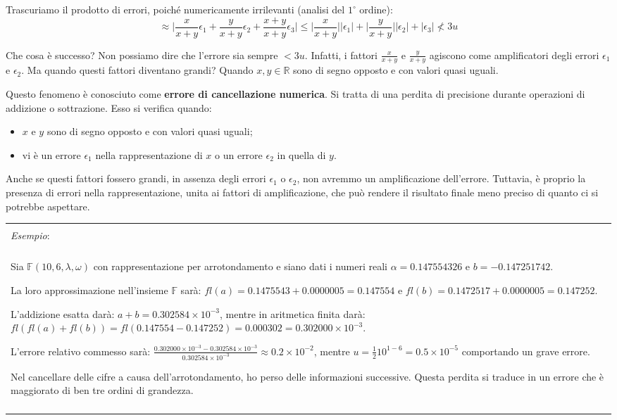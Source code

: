 \documentclass{article}
\newenvironment{example}
{\begin{center}
        \begin{tabular}{|p{0.9\textwidth}|}
            \hline \\ 
            \textit{Esempio}: \\\\ 
        }
        {
            \\\\ \hline
        \end{tabular}
    \end{center}
}
\begin{document}
\begin{itemize}
        Trascuriamo il prodotto di errori, poiché numericamente irrilevanti
        (analisi del $1^{\circ}$ ordine):
        $$\approx \Big\lvert
        \frac{x}{x+y}\epsilon_1+\frac{y}{x+y}\epsilon_2+\frac{x+y}{x+y}\epsilon_3\Big\rvert\leq
        \Big\lvert \frac{x}{x+y}\Big\rvert\lvert \epsilon_1\rvert+\Big\lvert
        \frac{y}{x+y}\Big\rvert \lvert \epsilon_2\rvert+\lvert
        \epsilon_3\rvert\nless 3u$$

        Che cosa è successo? Non possiamo dire che l'errore sia sempre $<3u$.
        Infatti, i fattori $\frac{x}{x+y}$ e $\frac{y}{x+y}$ agiscono come
        amplificatori degli errori $\epsilon_1$ e $\epsilon_2$. Ma quando questi fattori diventano grandi?
        Quando $x,y\in \mathbb{R}$ sono di segno opposto e con valori quasi
        uguali. 

        Questo fenomeno è conosciuto come \textbf{errore di
        cancellazione numerica}. Si tratta di una perdita di
        precisione durante operazioni di addizione o sottrazione. Esso si
        verifica quando:
        \begin{itemize}
            \item $x$ e $y$ sono di segno opposto e con valori quasi uguali;
            \item vi è un errore $\epsilon_1$ nella rappresentazione di $x$ o
                un errore $\epsilon_2$ in quella di $y$.
        \end{itemize}
        Anche se questi fattori fossero grandi, in assenza degli
        errori $\epsilon_1$ o $\epsilon_2$, non avremmo un amplificazione
        dell'errore. Tuttavia, è proprio la presenza di errori nella
        rappresentazione, unita ai fattori di amplificazione, che può
        rendere il risultato finale meno preciso di quanto ci si potrebbe
        aspettare.
\end{itemize}
\begin{example}
   Sia $\mathbb{F}(10,6,\lambda,\omega)$ con rappresentazione per arrotondamento e siano
   dati i numeri reali $\alpha=0.147554326$ e $b=-0.147251742$. 

   La loro approssimazione nell'insieme $\mathbb{F}$ sarà:
   $fl(a)=0.1475543+0.0000005=0.147554$ e
   $fl(b)=0.1472517+0.0000005=0.147252$.

   L'addizione esatta darà: $a+b=0.302584\times10^{-3}$, mentre in aritmetica
   finita darà:
   $fl(fl(a)+fl(b))=fl(0.147554-0.147252)=0.000302=0.302000\times10^{-3}$.

   L'errore relativo commesso sarà:
   $\frac{0.302000\times10^{-3}-0.302584\times10^{-3}}{0.302584\times10^{-3}}\approx0.2\times10^{-2}$,
   mentre $u=\frac{1}{2}10^{1-6}=0.5\times10^{-5}$ comportando un grave
   errore.

   Nel cancellare delle cifre a causa dell'arrotondamento, ho perso
   delle informazioni successive. Questa perdita si traduce in un errore che è
   maggiorato di ben tre ordini di grandezza. 
\end{example}
\end{document}
